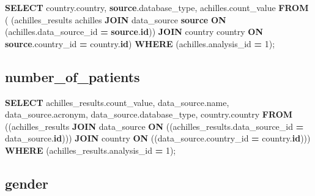 \documentclass[
]{book}
\newenvironment{Shaded}{\begin{snugshade}}{\end{snugshade}}
\newcommand{\DecValTok}[1]{\textcolor[rgb]{0.00,0.00,0.81}{#1}}
\newcommand{\KeywordTok}[1]{\textcolor[rgb]{0.13,0.29,0.53}{\textbf{#1}}}
\newcommand{\NormalTok}[1]{#1}
\newcommand{\OperatorTok}[1]{\textcolor[rgb]{0.81,0.36,0.00}{\textbf{#1}}}
\begin{document}
\begin{Shaded}
\begin{Highlighting}[]
\KeywordTok{SELECT}\NormalTok{ country.country,}
   \KeywordTok{source}\NormalTok{.database\_type,}
\NormalTok{   achilles.count\_value}
  \KeywordTok{FROM}\NormalTok{ (}
\NormalTok{    (achilles\_results achilles }\KeywordTok{JOIN}\NormalTok{ data\_source }\KeywordTok{source}
      \KeywordTok{ON}\NormalTok{ (achilles.data\_source\_id }\OperatorTok{=} \KeywordTok{source}\NormalTok{.}\KeywordTok{id}\NormalTok{))}
    \KeywordTok{JOIN}\NormalTok{ country country }\KeywordTok{ON} \KeywordTok{source}\NormalTok{.country\_id }\OperatorTok{=}\NormalTok{ country.}\KeywordTok{id}\NormalTok{)}
 \KeywordTok{WHERE}\NormalTok{ (achilles.analysis\_id }\OperatorTok{=} \DecValTok{1}\NormalTok{);}
\end{Highlighting}
\end{Shaded}

\hypertarget{number_of_patients}{%
\subsection*{number\_of\_patients}\label{number_of_patients}}

\begin{Shaded}
\begin{Highlighting}[]
\KeywordTok{SELECT}\NormalTok{ achilles\_results.count\_value,}
\NormalTok{   data\_source.name,}
\NormalTok{   data\_source.acronym,}
\NormalTok{   data\_source.database\_type,}
\NormalTok{   country.country}
  \KeywordTok{FROM}\NormalTok{ ((achilles\_results }\KeywordTok{JOIN}\NormalTok{ data\_source}
      \KeywordTok{ON}\NormalTok{ ((achilles\_results.data\_source\_id }\OperatorTok{=}\NormalTok{ data\_source.}\KeywordTok{id}\NormalTok{)))}
    \KeywordTok{JOIN}\NormalTok{ country }\KeywordTok{ON}\NormalTok{ ((data\_source.country\_id }\OperatorTok{=}\NormalTok{ country.}\KeywordTok{id}\NormalTok{)))}
 \KeywordTok{WHERE}\NormalTok{ (achilles\_results.analysis\_id }\OperatorTok{=} \DecValTok{1}\NormalTok{);}
\end{Highlighting}
\end{Shaded}

\hypertarget{gender}{%
\subsection*{gender}\label{gender}}
\end{document}
